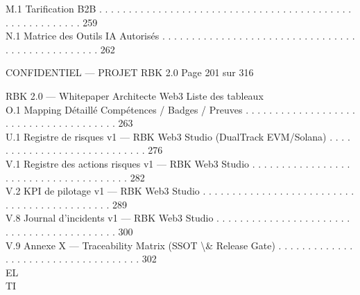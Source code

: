 \vspace{0.5em}
M.1 Tarification B2B    . . . . . . . . . . . . . . . . . . . . . . . . . . . . . . . . . . . . . . . . . . . . . . . . . . . . . . . . 259\\
\vspace{0.5em}
N.1 Matrice des Outils IA Autorisés . . . . . . . . . . . . . . . . . . . . . . . . . . . . . . . . . . . . . . . . . . . . . . . . . 262\\
\vspace{0.5em}
\vspace{0.5em}
\vspace{0.5em}
\begin{confidential}CONFIDENTIEL — PROJET RBK 2.0                                 Page 201 sur 316\end{confidential}
RBK 2.0 — Whitepaper Architecte Web3                                                                                      Liste des tableaux\\
\vspace{0.5em}
\vspace{0.5em}
O.1 Mapping Détaillé Compétences / Badges / Preuves . . . . . . . . . . . . . . . . . . . . . . . . . . . . . . . . . . . . . . 263\\
\vspace{0.5em}
U.1 Registre de risques v1 — RBK Web3 Studio (DualTrack EVM/Solana)          . . . . . . . . . . . . . . . . . . . . . . . . . . . . 276\\
\vspace{0.5em}
V.1   Registre des actions risques v1 — RBK Web3 Studio . . . . . . . . . . . . . . . . . . . . . . . . . . . . . . . . . . . . . . 282\\
V.2   KPI de pilotage v1 — RBK Web3 Studio . . . . . . . . . . . . . . . . . . . . . . . . . . . . . . . . . . . . . . . . . . . . 289\\
V.8   Journal d’incidents v1 — RBK Web3 Studio . . . . . . . . . . . . . . . . . . . . . . . . . . . . . . . . . . . . . . . . . . 300\\
V.9   Annexe X — Traceability Matrix (SSOT \textbackslash{}& Release Gate) . . . . . . . . . . . . . . . . . . . . . . . . . . . . . . . . . . . . 302\\
\vspace{0.5em}
\vspace{0.5em}
\vspace{0.5em}
\vspace{0.5em}
EL\\
TI\\
